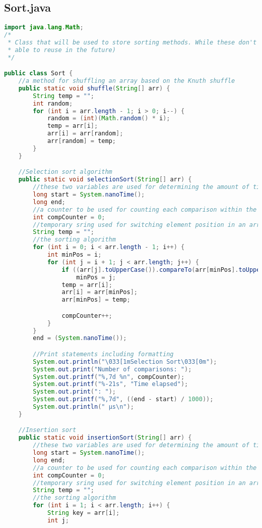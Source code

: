 \documentclass[letterpaper, 10pt,DIV=13]{scrartcl}
\numberwithin{equation}{section} %
\numberwithin{figure}{section} %
\numberwithin{table}{section} %
\begin{document}
\subsection{Sort.java}
\begin{lstlisting}[frame=single, breaklines, language=java]  
import java.lang.Math;
/* 
 * Class that will be used to store sorting methods. While these don't necessarily need to be in their own class, I prefer it to keep things organized (and potentially be
 * able to reuse in the future)
 */

public class Sort {
    //a method for shuffling an array based on the Knuth shuffle
    public static void shuffle(String[] arr) {
        String temp = "";
        int random;
        for (int i = arr.length - 1; i > 0; i--) {
            random = (int)(Math.random() * i);
            temp = arr[i];
            arr[i] = arr[random];
            arr[random] = temp;
        } 
    }

    //Selection sort algorithm
    public static void selectionSort(String[] arr) {
        //these two variables are used for determining the amount of time elapsed during the method execution
        long start = System.nanoTime();
        long end;
        //a counter to be used for counting each comparison within the sort.
        int compCounter = 0;
        //temporary sring used for switching element position in an array.
        String temp = "";
        //the sorting algorithm
        for (int i = 0; i < arr.length - 1; i++) {
            int minPos = i;
            for (int j = i + 1; j < arr.length; j++) {
                if ((arr[j].toUpperCase()).compareTo(arr[minPos].toUpperCase()) < 0)
                    minPos = j;
                temp = arr[i];
                arr[i] = arr[minPos];
                arr[minPos] = temp;

                compCounter++;
            }
        }
        end = (System.nanoTime());

        //Print statements including formatting
        System.out.println("\033[1mSelection Sort\033[0m");
        System.out.print("Number of comparisons: ");
        System.out.printf("%,7d %n", compCounter);
        System.out.printf("%-21s", "Time elapsed");
        System.out.print(": ");
        System.out.printf("%,7d", ((end - start) / 1000));
        System.out.println(" µs\n");
    }

    //Insertion sort
    public static void insertionSort(String[] arr) {
        //these two variables are used for determining the amount of time elapsed during the method execution
        long start = System.nanoTime();
        long end;
        //a counter to be used for counting each comparison within the sort.
        int compCounter = 0;
        //temporary sring used for switching element position in an array.
        String temp = "";
        //the sorting algorithm
        for (int i = 1; i < arr.length; i++) {
            String key = arr[i];
            int j;


\end{lstlisting}
\end{document}
